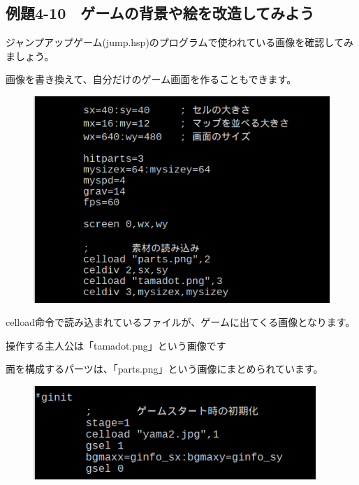 \newpage
\subsection{例題4-10　ゲームの背景や絵を改造してみよう}


\begin{description}
    \item {}
\end{description}

ジャンプアップゲーム(jump.hsp)のプログラムで使われている画像を確認してみましょう。

画像を書き換えて、自分だけのゲーム画面を作ることもできます。

\begin{figure}[H]
    \begin{center}
      \includegraphics[keepaspectratio]{text04-img/text04-img026.png}
    \end{center}
    \label{fig:prog_menu}
\end{figure}

celload命令で読み込まれているファイルが、ゲームに出てくる画像となります。

操作する主人公は「tamadot.png」という画像です

面を構成するパーツは、「parts.png」という画像にまとめられています。

\begin{figure}[H]
    \begin{center}
      \includegraphics[keepaspectratio,width=10.689cm,height=3.538cm]{text04-img/text04-img027.png}
    \end{center}
    \label{fig:prog_menu}
\end{figure}


